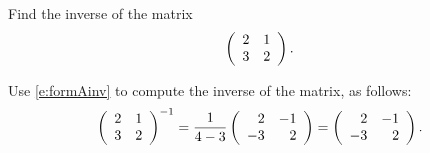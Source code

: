 \documentclass{ximera}
\begin{document}
\begin{exercise} \label{c4.9.1}
Find the inverse of the matrix
\[
\left(\begin{array}{rr} 2 & 1\\ 3 &2\end{array}\right).
\]

\begin{solution}

Use \eqref{e:formAinv} to compute the inverse of the matrix,
as follows:
\[ \left(\begin{array}{rr} 2 & 1\\ 3 &2\end{array}\right)^{-1} = \frac{1}{4-3}\left(\begin{array}{rr} 2 & -1\\ -3 &2\end{array}\right)
= \left(\begin{array}{rr} 2 & -1\\ -3 &2\end{array}\right). \]

\end{solution}
\end{exercise}
\end{document}
